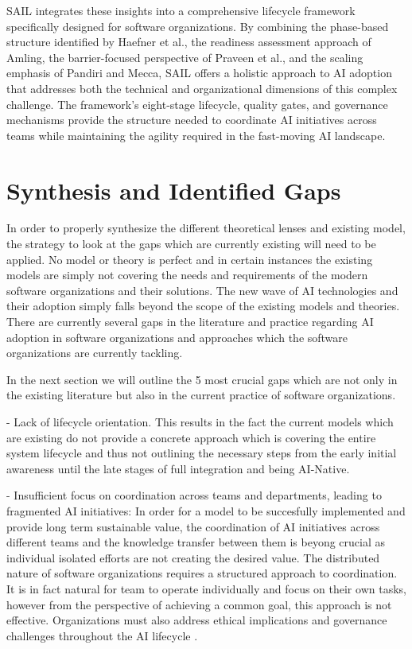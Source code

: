 \documentclass[]{imc-inf}
\begin{document}
SAIL integrates these insights into a comprehensive lifecycle framework specifically designed for software organizations. By combining the phase-based structure identified by Haefner et al., the readiness assessment approach of Amling, the barrier-focused perspective of Praveen et al., and the scaling emphasis of Pandiri and Mecca, SAIL offers a holistic approach to AI adoption that addresses both the technical and organizational dimensions of this complex challenge. The framework's eight-stage lifecycle, quality gates, and governance mechanisms provide the structure needed to coordinate AI initiatives across teams while maintaining the agility required in the fast-moving AI landscape.



\section{Synthesis and Identified
	Gaps}\label{synthesis-and-identified-gaps}


In order to properly synthesize the different theoretical lenses and existing model, the strategy to look at the gaps which are currently existing will need to be applied. No model or theory is perfect and in certain instances the existing models are simply not covering the needs and requirements of the modern software organizations and their solutions. The new wave of AI technologies and their adoption simply falls beyond the scope of the existing models and theories. There are currently several gaps in the literature and practice regarding AI adoption in software organizations and approaches which the software organizations are currently tackling.

In the next section we will outline the 5 most crucial gaps which are not only in the existing literature but also in the current practice of software organizations.

- Lack of lifecycle orientation. This results in the fact the current models which are existing do not provide a concrete approach which is covering the entire system lifecycle and thus not outlining the necessary steps from the early initial awareness until the late stages of full integration and being AI-Native.

- Insufficient focus on coordination across teams and departments, leading to fragmented AI initiatives:  In order for a model to be succesfully implemented and provide long term sustainable value, the coordination of AI initiatives across different teams and the knowledge transfer between them is beyong crucial as individual isolated efforts are not creating the desired value. The distributed nature of software organizations requires a structured approach to coordination. It is in fact natural for team to operate individually and focus on their own tasks, however from the perspective of achieving a common goal, this approach is not effective. Organizations must also address ethical implications and governance challenges throughout the AI lifecycle \citep{Vidgen2021, Felzmann2019}.
\end{document}
